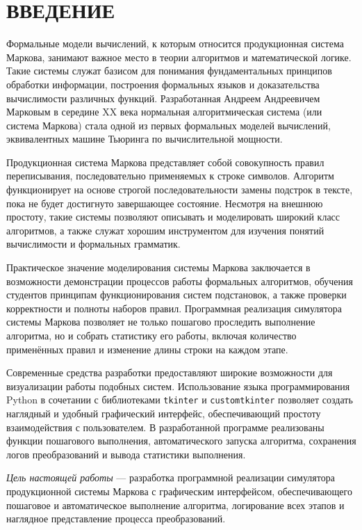 \section*{ВВЕДЕНИЕ}

Формальные модели вычислений, к которым относится продукционная система Маркова, занимают важное место в теории алгоритмов и математической логике. Такие системы служат базисом для понимания фундаментальных принципов обработки информации, построения формальных языков и доказательства вычислимости различных функций. Разработанная Андреем Андреевичем Марковым в середине XX века нормальная алгоритмическая система (или система Маркова) стала одной из первых формальных моделей вычислений, эквивалентных машине Тьюринга по вычислительной мощности.

Продукционная система Маркова представляет собой совокупность правил переписывания, последовательно применяемых к строке символов. Алгоритм функционирует на основе строгой последовательности замены подстрок в тексте, пока не будет достигнуто завершающее состояние. Несмотря на внешнюю простоту, такие системы позволяют описывать и моделировать широкий класс алгоритмов, а также служат хорошим инструментом для изучения понятий вычислимости и формальных грамматик.

Практическое значение моделирования системы Маркова заключается в возможности демонстрации процессов работы формальных алгоритмов, обучения студентов принципам функционирования систем подстановок, а также проверки корректности и полноты наборов правил. Программная реализация симулятора системы Маркова позволяет не только пошагово проследить выполнение алгоритма, но и собрать статистику его работы, включая количество применённых правил и изменение длины строки на каждом этапе.

Современные средства разработки предоставляют широкие возможности для визуализации работы подобных систем. Использование языка программирования Python в сочетании с библиотеками \texttt{tkinter} и \texttt{customtkinter} позволяет создать наглядный и удобный графический интерфейс, обеспечивающий простоту взаимодействия с пользователем. В разработанной программе реализованы функции пошагового выполнения, автоматического запуска алгоритма, сохранения логов преобразований и вывода статистики выполнения.

\emph{Цель настоящей работы} — разработка программной реализации симулятора продукционной системы Маркова с графическим интерфейсом, обеспечивающего пошаговое и автоматическое выполнение алгоритма, логирование всех этапов и наглядное представление процесса преобразований.

